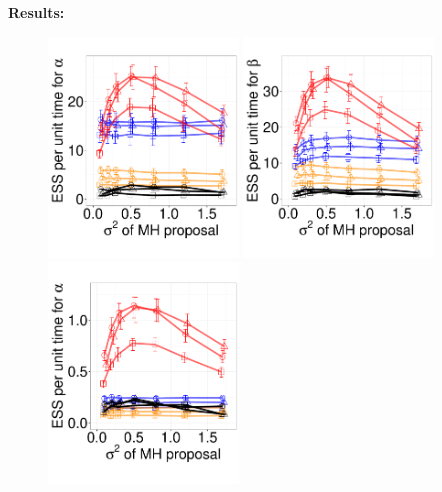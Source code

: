 \noindent \textbf{Results:}
  \begin{figure}%
  \centering
  \begin{minipage}[!hp]{0.75\linewidth}
  \centering
    \includegraphics [width=0.45\textwidth, angle=0]{figures_new_apr12/exp_alpha_dim3_18apr12.pdf}
    \includegraphics [width=0.45\textwidth, angle=0]{figures_new_apr12/exp_beta_dim3_18apr12.pdf}
  \centering
    \includegraphics [width=0.45\textwidth, angle=0]{figures_new_apr12/exp_alpha_dim10_18apr12.pdf}
    \vspace{-0 in}

\end{minipage}
\end{figure}
